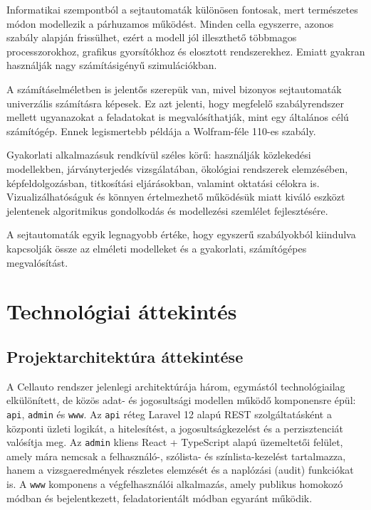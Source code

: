 \documentclass{thesis-ekf}
\begin{document}
Informatikai szempontból a sejtautomaták különösen fontosak, mert természetes módon modellezik a párhuzamos működést. Minden cella egyszerre, azonos szabály alapján frissülhet, ezért a modell jól illeszthető többmagos processzorokhoz, grafikus gyorsítókhoz és elosztott rendszerekhez. Emiatt gyakran használják nagy számításigényű szimulációkban.

A számításelméletben is jelentős szerepük van, mivel bizonyos sejtautomaták univerzális számításra képesek. Ez azt jelenti, hogy megfelelő szabályrendszer mellett ugyanazokat a feladatokat is megvalósíthatják, mint egy általános célú számítógép. Ennek legismertebb példája a Wolfram-féle 110-es szabály.

Gyakorlati alkalmazásuk rendkívül széles körű: használják közlekedési modellekben, járványterjedés vizsgálatában, ökológiai rendszerek elemzésében, képfeldolgozásban, titkosítási eljárásokban, valamint oktatási célokra is. Vizualizálhatóságuk és könnyen értelmezhető működésük miatt kiváló eszközt jelentenek algoritmikus gondolkodás és modellezési szemlélet fejlesztésére.

A sejtautomaták egyik legnagyobb értéke, hogy egyszerű szabályokból kiindulva kapcsolják össze az elméleti modelleket és a gyakorlati, számítógépes megvalósítást.

\chapter{Technológiai áttekintés}

\section{Projektarchitektúra áttekintése}
A Cellauto rendszer jelenlegi architektúrája három, egymástól technológiailag elkülönített, de közös adat- és jogosultsági modellen működő komponensre épül: \texttt{api}, \texttt{admin} és \texttt{www}. Az \texttt{api} réteg Laravel 12 alapú REST szolgáltatásként \cite{laravel,laravel-releases} a központi üzleti logikát, a hitelesítést, a jogosultságkezelést és a perzisztenciát valósítja meg. Az \texttt{admin} kliens React + TypeScript alapú \cite{react,typescript-docs} üzemeltetői felület, amely mára nemcsak a felhasználó-, szólista- és színlista-kezelést tartalmazza, hanem a vizsgaeredmények részletes elemzését és a naplózási (audit) funkciókat is. A \texttt{www} komponens a végfelhasználói alkalmazás, amely publikus homokozó módban és bejelentkezett, feladatorientált módban egyaránt működik.
\end{document}
